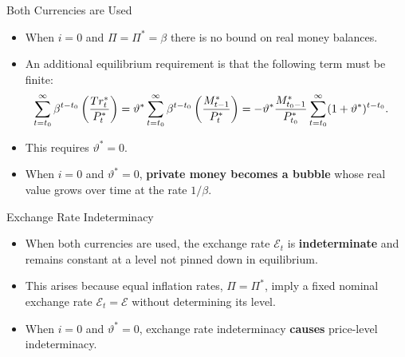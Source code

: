 \documentclass[11pt,aspectratio=169]{beamer}
\begin{document}
\begin{frame}{Both Currencies are Used}
    \begin{itemize}
        \item When $i = 0$ and $\Pi = \Pi^* = \beta$ there is no bound on real money balances.
        \vspace{0.4em}
        \item An additional equilibrium requirement is that the following term must be finite: 
\begin{align}
\sum_{t = t_0}^{\infty} \beta^{t - t_0} 
\left( \frac{Tr_t^*}{P_t^*} \right)
&= \vartheta^* \sum_{t = t_0}^{\infty} \beta^{t - t_0} 
\left( \frac{M_{t - 1}^*}{P_t^*} \right)
= - \vartheta^* \frac{M_{t_0 - 1}^*}{P_{t_0}^*} 
\sum_{t = t_0}^{\infty} (1 + \vartheta^*)^{t - t_0}. \label{2.47}
   \vspace{0.3em}
\end{align}
        \item This requires $\vartheta^* = 0$.
    \vspace{0.25em}
      \item When $i = 0$ and $\vartheta^* = 0$, \textbf{private money becomes a bubble} whose real value grows over time at the rate $1/\beta$.
\end{itemize}
\end{frame}

\begin{frame}{Exchange Rate Indeterminacy}
\begin{itemize}
    \item When both currencies are used, the exchange rate $\mathcal{E}_t$ is \textbf{indeterminate} and remains constant at a level not pinned down in equilibrium.
       \vspace{0.3em}
       \item This arises because equal inflation rates, $\Pi = \Pi^*$, imply a fixed nominal exchange rate $\mathcal{E}_t = \mathcal{E}$ without determining its level.
       \vspace{0.3em}
       \item When $i = 0$ and $\vartheta^* = 0$, exchange rate indeterminacy \textbf{causes} price-level indeterminacy.
 \end{itemize}
\end{frame}
\end{document}
